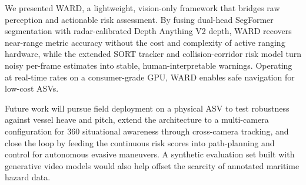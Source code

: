 
We presented WARD, a lightweight, vision-only framework that bridges raw perception and actionable risk assessment. By fusing dual-head SegFormer segmentation with radar-calibrated Depth Anything V2 depth, WARD recovers near-range metric accuracy without the cost and complexity of active ranging hardware, while the extended SORT tracker and collision-corridor risk model turn noisy per-frame estimates into stable, human-interpretable warnings. Operating at real-time rates on a consumer-grade GPU, WARD enables safe navigation for low-cost ASVs.

Future work will pursue field deployment on a physical ASV to test robustness against vessel heave and pitch, extend the architecture to a multi-camera configuration for 360\textdegree{} situational awareness through cross-camera tracking, and close the loop by feeding the continuous risk scores into path-planning and control for autonomous evasive maneuvers. A synthetic evaluation set built with generative video models would also help offset the scarcity of annotated maritime hazard data.
